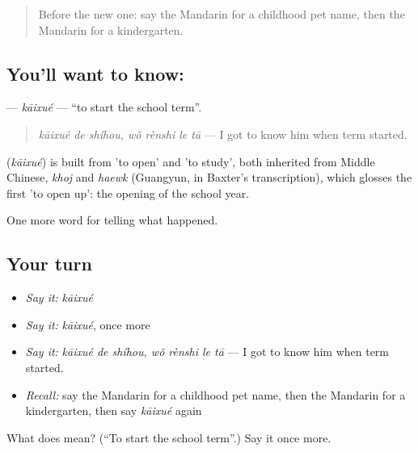 \begin{quote}
Before the new one: say the Mandarin for a childhood pet name, then the Mandarin for a kindergarten.
\end{quote}

\subsection*{You'll want to know: }
\textbf{} — \emph{kāixué} — \textquotedblleft{}to start the school term\textquotedblright{}.

\begin{quote}
\emph{kāixué de shíhou, wǒ rènshi le tā} — I got to know him when term started.
\end{quote}

\begin{cousinweb}
\textbf{} (\emph{kāixué}) is built from  'to open' and  'to study', both inherited from Middle Chinese, \emph{khoj} and \emph{haewk} (Guangyun, in Baxter's transcription), which glosses the first 'to open up': the opening of the school year.
\end{cousinweb}

\begin{grammarlens}[title={What you've built}]
One more word for telling what happened.
\end{grammarlens}

\subsection*{Your turn}
\begin{itemize}
\raggedright
  \item \emph{Say it:} \emph{kāixué}
  \item \emph{Say it:} \emph{kāixué}, once more
  \item \emph{Say it:} \emph{kāixué de shíhou, wǒ rènshi le tā} — I got to know him when term started.
  \item \emph{Recall:} say the Mandarin for a childhood pet name, then the Mandarin for a kindergarten, then say \emph{kāixué} again
\end{itemize}

\begin{tcolorbox}[breakable,colback=teal!4,colframe=teal!35!black,title={Before you move on}]
What does  mean? (\textquotedblleft{}To start the school term\textquotedblright{}.) Say it once more.
\end{tcolorbox}
